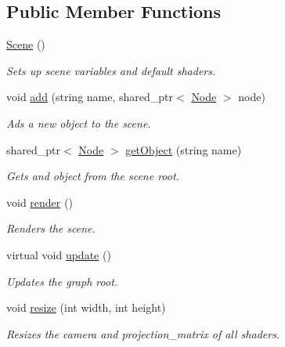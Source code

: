 \subsection*{Public Member Functions}
\begin{DoxyCompactItemize}
\item 
\mbox{\hyperlink{classoglsl_1_1_scene_a1d13c881f3b0b7d4d7bd8d5225a50481}{Scene}} ()
\begin{DoxyCompactList}\small\item\em Sets up scene variables and default shaders. \end{DoxyCompactList}\item 
void \mbox{\hyperlink{classoglsl_1_1_scene_a1b1296aab1c81101473a38451c139819}{add}} (string name, shared\+\_\+ptr$<$ \mbox{\hyperlink{classoglsl_1_1_node}{Node}} $>$ node)
\begin{DoxyCompactList}\small\item\em Ads a new object to the scene. \end{DoxyCompactList}\item 
shared\+\_\+ptr$<$ \mbox{\hyperlink{classoglsl_1_1_node}{Node}} $>$ \mbox{\hyperlink{classoglsl_1_1_scene_a10b398b3e59b41c5fb0dbadb8120e0f3}{get\+Object}} (string name)
\begin{DoxyCompactList}\small\item\em Gets and object from the scene root. \end{DoxyCompactList}\item 
void \mbox{\hyperlink{classoglsl_1_1_scene_a94b552369f7653c854d38a1553c84288}{render}} ()
\begin{DoxyCompactList}\small\item\em Renders the scene. \end{DoxyCompactList}\item 
virtual void \mbox{\hyperlink{classoglsl_1_1_scene_accbf0c6f23ccd909f63851c0bc547449}{update}} ()
\begin{DoxyCompactList}\small\item\em Updates the graph root. \end{DoxyCompactList}\item 
void \mbox{\hyperlink{classoglsl_1_1_scene_a1eac687cef62ac021bfdd98749aa2ee5}{resize}} (int width, int height)
\begin{DoxyCompactList}\small\item\em Resizes the camera and projection\+\_\+matrix of all shaders. \end{DoxyCompactList}\item 

\end{DoxyCompactItemize}
